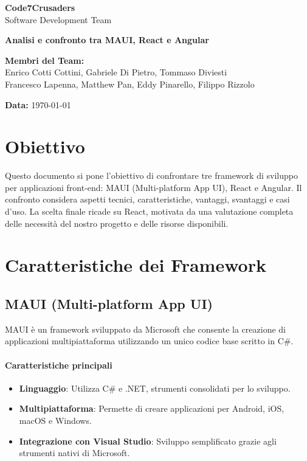 \documentclass{article}
\begin{document}
\begin{titlepage}
    {\Huge \textbf{Code7Crusaders}}\\
    \vspace{0.5cm}
    {\Large Software Development Team}\\
    \vspace{2cm}
    
    {\large \textbf{Analisi e confronto tra MAUI, React e Angular}}\\
    \vspace{5cm}

    \textbf{Membri del Team:}\\
    Enrico Cotti Cottini, Gabriele Di Pietro, Tommaso Diviesti \\
    Francesco Lapenna, Matthew Pan, Eddy Pinarello, Filippo Rizzolo \\
    \vspace{0.5cm}
    
    {\large \textbf{Data:}} \today\\
    
    \vspace{1cm}
\end{titlepage}
\clearpage

\newpage
\tableofcontents
\newpage

\section{Obiettivo}
Questo documento si pone l'obiettivo di confrontare tre framework di sviluppo per applicazioni front-end: MAUI (Multi-platform App UI), React e Angular. Il confronto considera aspetti tecnici, caratteristiche, vantaggi, svantaggi e casi d'uso. La scelta finale ricade su React, motivata da una valutazione completa delle necessit\`a del nostro progetto e delle risorse disponibili.

\section{Caratteristiche dei Framework}

\subsection{MAUI (Multi-platform App UI)}
MAUI \`e un framework sviluppato da Microsoft che consente la creazione di applicazioni multipiattaforma utilizzando un unico codice base scritto in C\#.

\paragraph*{Caratteristiche principali}
\begin{itemize}
    \item \textbf{Linguaggio}: Utilizza C\# e .NET, strumenti consolidati per lo sviluppo.
    \item \textbf{Multipiattaforma}: Permette di creare applicazioni per Android, iOS, macOS e Windows.
    \item \textbf{Integrazione con Visual Studio}: Sviluppo semplificato grazie agli strumenti nativi di Microsoft.
\end{itemize}
\end{document}
